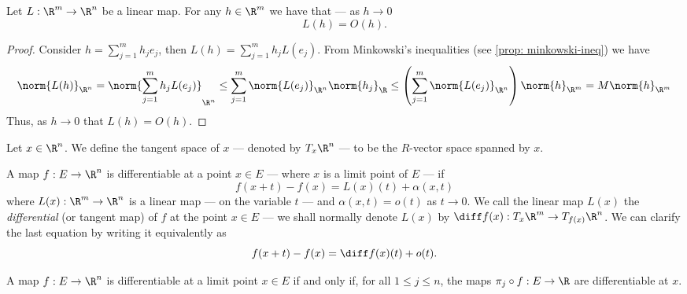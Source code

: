 \begin{proposition}\label{prop: linear-big-oh}
  Let \(L: \R^m \to \R^n\) be a linear map. For any \(h \in \R^m\) we have that
  --- as \(h \to 0\)
  \[
    L(h) = O(h).
  \]
\end{proposition}

\begin{proof}
  Consider \(h = \sum_{j = 1}^m h_j e_j\), then \(L(h) = \sum_{j=1}^m h_j
  L(e_j)\). From Minkowski's inequalities (see \cref{prop: minkowski-ineq}) we
  have
  \[
    \norm{L(h)}_{\R^n} = \norm{\sum_{j=1}^m h_j L(e_j)}_{\R^n}
    \leq \sum_{j=1}^m \norm{L(e_j)}_{\R^n} \norm{h_j}_\R
    \leq \left(\sum_{j=1}^m \norm{L(e_j)}_{\R^n}\right) \norm{h}_{\R^m}
    = M \norm{h}_{\R^m}
  \]
  Thus, as \(h \to 0\) that \(L(h) = O(h)\).
\end{proof}

\begin{definition}
  Let \(x \in \R^n\). We define the tangent space of \(x\) --- denoted by
  \(T_x\R^n\) --- to be the \(R\)-vector space spanned by \(x\).
\end{definition}

\begin{definition}[Differentiable]\label{def: diff-several}
  A map \(f: E \to \R^n\) is differentiable at a point \(x \in E\) --- where
  \(x\) is a limit point of \(E\) --- if
  \begin{equation}\label{eq: diff-several-1}
    f(x + t) - f(x) = L(x)(t) + \alpha(x, t)
  \end{equation}
  where \(L(x): \R^m \to \R^n\) is a linear map --- on the variable \(t\) ---
  and \(\alpha(x, t) = o(t)\) as \(t \to 0\). We call the linear map \(L(x)\)
  the \emph{differential} (or tangent map) of \(f\) at the point \(x \in E\) ---
  we shall normally denote \(L(x)\) by \(\diff f(x): T_x\R^m \to T_{f(x)}\R^n\).
  We can clarify the last equation by writing it equivalently as
  \begin{equation}\label{eq: diff-several-2}
    f(x + t) - f(x) = \diff f(x)(t) + o(t).
  \end{equation}
\end{definition}

\begin{proposition}
  A map \(f: E \to \R^n\) is differentiable at a limit point \(x \in E\) if and
  only if, for all \(1 \leq j \leq n\), the maps \(\pi_j \circ f: E \to \R\) are
  differentiable at \(x\).
\end{proposition}

